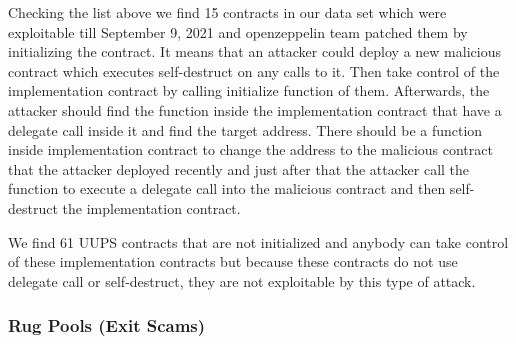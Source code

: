 Checking the list above we find 15 contracts in our data set which were exploitable till September 9, 2021 and openzeppelin team patched them by initializing the contract. It means that an attacker could deploy a new malicious contract which executes self-destruct on any calls to it. Then take control of the implementation contract by calling initialize function of them. Afterwards, the attacker should find the function inside the implementation contract that have a delegate call inside it and find the target address. There should be a function inside implementation contract to change the address to the malicious contract that the attacker deployed recently and just after that the attacker call the function to execute a delegate call into the malicious contract and then self-destruct the implementation contract.

We find 61 UUPS contracts that are not initialized and anybody can take control of these implementation contracts but because these contracts do not use delegate call or self-destruct, they are not exploitable by this type of attack.

\subsubsection{Rug Pools (Exit Scams)}








